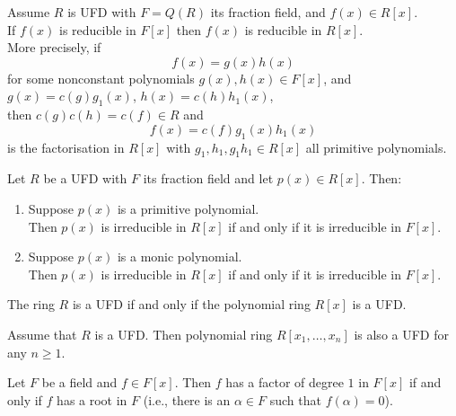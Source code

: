 \begin{proposition}
 Assume $R$ is UFD with $F=Q(R)$ its fraction field, and $f(x) \in R[x]$.\\
If $f(x)$ is reducible in $F[x]$ then $f(x)$ is reducible in $R[x]$.\\
More precisely, if 
\begin{equation}
f(x)=g(x)h(x) \nonumber
\end{equation}
for some nonconstant polynomials $g(x), h(x) \in F[x]$, and $g(x)=c(g)g_1(x)$, $h(x)=c(h)h_1(x)$,\\
then $c(g)c(h)=c(f) \in R$ and 
\begin{equation}
f(x)=c(f)g_1(x)h_1(x) \nonumber
\end{equation}
is the factorisation in $R[x]$ with $g_1, h_1, g_1 h_1 \in R[x]$ all primitive polynomials.
\end{proposition}

\begin{proposition}
 Let $R$ be a UFD with $F$ its fraction field and let $p(x) \in R[x]$. Then:
\begin{enumerate}[label=(\roman*)]
\item Suppose $p(x)$ is a primitive polynomial.\\
Then $p(x)$ is irreducible in $R[x]$ if and only if it is irreducible in $F[x]$.
\item Suppose $p(x)$ is a monic polynomial.\\
Then $p(x)$ is irreducible in $R[x]$ if and only if it is irreducible in $F[x]$.
\end{enumerate}
\end{proposition}

\begin{theorem}
The ring $R$ is a UFD if and only if the polynomial ring $R[x]$ is a UFD.
\end{theorem}

\begin{corollary}
Assume that $R$ is a UFD. Then polynomial ring $R[x_1, \ldots, x_n]$ is also a UFD for any $n \geq 1$.
\end{corollary}

\begin{proposition}
Let $F$ be a field and $f \in F[x]$. Then $f$ has a factor of degree $1$ in $F[x]$ if and only if $f$ has a root in $F$ (i.e., there is an $\alpha \in F$ such that $f(\alpha) = 0$).
\end{proposition}

